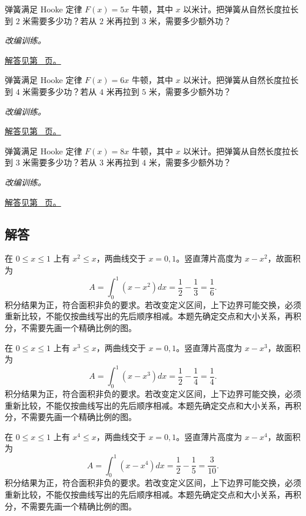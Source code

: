 \documentclass[12pt,fontset=fandol]{ctexart}
\begin{document}
\begin{example}[变力做功]\label{ex:c21q22}
弹簧满足 Hooke 定律 $F(x)=5x$ 牛顿，其中 $x$ 以米计。把弹簧从自然长度拉长到 $2$ 米需要多少功？若从 $2$ 米再拉到 $3$ 米，需要多少额外功？
\par\textit{改编训练。}\par\hyperref[ans:c21q22]{解答见第~\pageref{ans:c21q22} 页。}
\end{example}
\begin{example}[变力做功]\label{ex:c21q23}
弹簧满足 Hooke 定律 $F(x)=6x$ 牛顿，其中 $x$ 以米计。把弹簧从自然长度拉长到 $4$ 米需要多少功？若从 $4$ 米再拉到 $5$ 米，需要多少额外功？
\par\textit{改编训练。}\par\hyperref[ans:c21q23]{解答见第~\pageref{ans:c21q23} 页。}
\end{example}
\begin{example}[变力做功]\label{ex:c21q24}
弹簧满足 Hooke 定律 $F(x)=8x$ 牛顿，其中 $x$ 以米计。把弹簧从自然长度拉长到 $3$ 米需要多少功？若从 $3$ 米再拉到 $4$ 米，需要多少额外功？
\par\textit{改编训练。}\par\hyperref[ans:c21q24]{解答见第~\pageref{ans:c21q24} 页。}
\end{example}
\subsection{解答}
\begin{solve}\label{ans:c21q1}
在 $0\le x\le1$ 上有 $x^{2}\le x$，两曲线交于 $x=0,1$。竖直薄片高度为 $x-x^{2}$，故面积为
\[
A=\int_0^1(x-x^{2})dx=\frac12-\frac1{3}=\frac{1}{6}.
\]
积分结果为正，符合面积非负的要求。若改变定义区间，上下边界可能交换，必须重新比较，不能仅按曲线写出的先后顺序相减。本题先确定交点和大小关系，再积分，不需要先画一个精确比例的图。
\end{solve}

\begin{solve}\label{ans:c21q2}
在 $0\le x\le1$ 上有 $x^{3}\le x$，两曲线交于 $x=0,1$。竖直薄片高度为 $x-x^{3}$，故面积为
\[
A=\int_0^1(x-x^{3})dx=\frac12-\frac1{4}=\frac{1}{4}.
\]
积分结果为正，符合面积非负的要求。若改变定义区间，上下边界可能交换，必须重新比较，不能仅按曲线写出的先后顺序相减。本题先确定交点和大小关系，再积分，不需要先画一个精确比例的图。
\end{solve}

\begin{solve}\label{ans:c21q3}
在 $0\le x\le1$ 上有 $x^{4}\le x$，两曲线交于 $x=0,1$。竖直薄片高度为 $x-x^{4}$，故面积为
\[
A=\int_0^1(x-x^{4})dx=\frac12-\frac1{5}=\frac{3}{10}.
\]
积分结果为正，符合面积非负的要求。若改变定义区间，上下边界可能交换，必须重新比较，不能仅按曲线写出的先后顺序相减。本题先确定交点和大小关系，再积分，不需要先画一个精确比例的图。
\end{solve}
\end{document}
